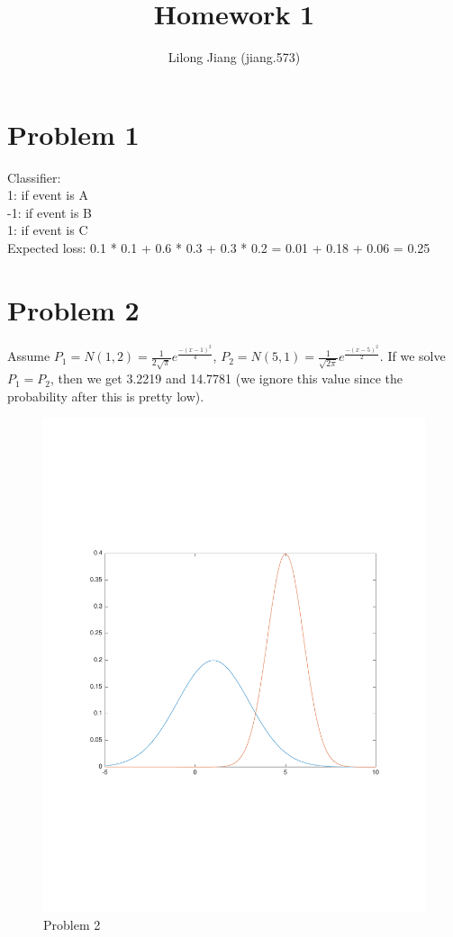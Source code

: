 \documentclass{article}
\begin{document}
\title{Homework 1}
\author{Lilong Jiang (jiang.573)}
\maketitle
\section{Problem 1}
Classifier: \\
1: if event is A \\
-1: if event is B \\
1: if event is C\\
Expected loss: 0.1 * 0.1 + 0.6 * 0.3 + 0.3 * 0.2 = 0.01 + 0.18 + 0.06 = 0.25 

\section{Problem 2}
Assume $P_1 = N(1, 2) = \frac{1}{2\sqrt{\pi}}e^\frac{-(x-1)^2}{4}$, $P_2 = N(5,1) = \frac{1}{\sqrt{2\pi}}e^\frac{-(x-5)^2}{2}$. If we solve $P_1 = P_2$, then we get 3.2219 and 14.7781 (we ignore this value since the probability after this is pretty low).\\
\begin{figure}
	\includegraphics[width=\textwidth]{p2}
	\caption{Problem 2}
	\label{fig:p2}
\end{figure}
\end{document}
